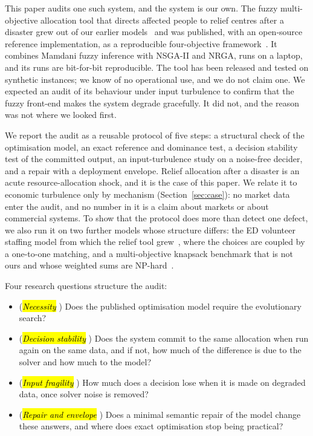 \documentclass[systems,article,accept,moreauthors,pdftex]{Definitions/mdpi}
\begin{document}
This paper audits one such system, and the system is our own. The fuzzy multi-objective
allocation tool that directs affected people to relief centres after a disaster grew out of
our earlier models~\cite{rabiei2021vehicle,rabiei2023volunteer} and was published, with an
open-source reference implementation, as a reproducible four-objective
framework~\cite{rabiei2026resilient}. It combines Mamdani fuzzy inference with NSGA-II and
NRGA, runs on a laptop, and its runs are bit-for-bit reproducible. The tool has been released
and tested on synthetic instances; we know of no operational use, and we do not claim one. We
expected an audit of its behaviour under input turbulence to confirm that the fuzzy front-end
makes the system degrade gracefully. It did not, and the reason was not where we looked first.

We report the audit as a reusable protocol of five steps: a structural check of the
optimisation model, an exact reference and dominance test, a decision stability test of the
committed output, an input-turbulence study on a noise-free decider, and a repair with a
deployment envelope. Relief allocation after a disaster is an acute resource-allocation shock,
and it is the case of this paper. We relate it to economic turbulence only by mechanism
(Section~\ref{sec:case}): no market data enter the audit, and no number in it is a claim about
markets or about commercial systems. To show that the protocol does more than detect one
defect, we also run it on two further models whose structure differs: the ED volunteer staffing
model from which the relief tool grew~\cite{rabiei2023volunteer}, where the choices are coupled
by a one-to-one matching, and a multi-objective knapsack benchmark that is not ours and whose
weighted sums are NP-hard~\cite{zitzler1999spea}.

Four research questions structure the audit:
\begin{itemize}
\item[RQ1] (\emph{\hl{Necessity}%
}) Does the published optimisation model require the evolutionary
search?
\item[RQ2] (\emph{\hl{Decision stability}%
}) Does the system commit to the same allocation when run
again on the same data, and if not, how much of the difference is due to the solver and how
much to the model?
\item[RQ3] (\emph{\hl{Input fragility}%
}) How much does a decision lose when it is made on degraded
data, once solver noise is removed?
\item[RQ4] (\emph{\hl{Repair and envelope}%
}) Does a minimal semantic repair of the model change
these answers, and where does exact optimisation stop being practical?
\end{itemize}
\end{document}
